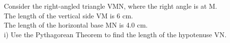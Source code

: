 \documentclass[preview]{standalone}
\begin{document}
\begin{center}
\begin{minipage}{12cm}
\raggedright Consider the right-angled triangle VMN, where the right angle is at M. \\
 The length of the vertical side VM is 6 cm. \\
 The length of the horizontal base MN is 4.0 cm. \\
 i) Use the Pythagorean Theorem to find the length of the hypotenuse VN.
\end{minipage}
\end{center}
\end{document}
